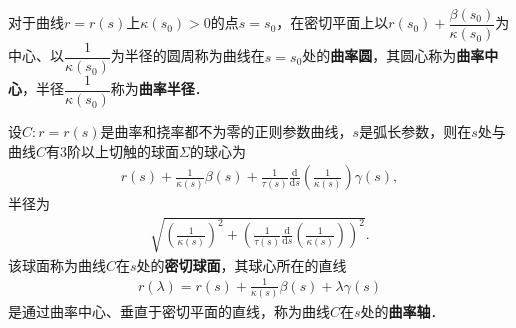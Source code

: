 \documentclass[../../main.tex]{subfiles}%
\begin{document}
\begin{definition}
对于曲线$r=r(s)$上$\kappa(s_0)>0$的点$s=s_0$，在密切平面上以$r(s_0)+\dfrac{\beta(s_0)}{\kappa(s_0)}$为中心、以$\dfrac{1}{\kappa(s_0)}$为半径的圆周称为曲线在$s=s_0$处的\textbf{曲率圆}，其圆心称为\textbf{曲率中心}，半径$\dfrac{1}{\kappa(s_0)}$称为\textbf{曲率半径}．
\end{definition}

\begin{theorem}\label{theorem:曲线的密切球面和曲率轴}
设$C: r=r(s)$是曲率和挠率都不为零的正则参数曲线，$s$是弧长参数，则在$s$处与曲线$C$有$3$阶以上切触的球面$\Sigma$的球心为
\begin{align*}
r(s)+\frac{1}{\kappa (s)}\beta (s)+\frac{1}{\tau (s)}\frac{\mathrm{d}}{\mathrm{d}s}\left( \frac{1}{\kappa (s)} \right) \gamma (s), 
\end{align*}
半径为
\begin{align*}
\sqrt{\left( \frac{1}{\kappa (s)} \right) ^2+\left( \frac{1}{\tau (s)}\frac{\mathrm{d}}{\mathrm{d}s}\left( \frac{1}{\kappa (s)} \right) \right) ^2}.
\end{align*}
该球面称为曲线$C$在$s$处的\textbf{密切球面}，其球心所在的直线
\begin{align*}
r(\lambda) = r(s)+\frac{1}{\kappa(s)}\beta(s)+\lambda\gamma(s)
\end{align*}
是通过曲率中心、垂直于密切平面的直线，称为曲线$C$在$s$处的\textbf{曲率轴}．
\end{theorem}
\end{document}
